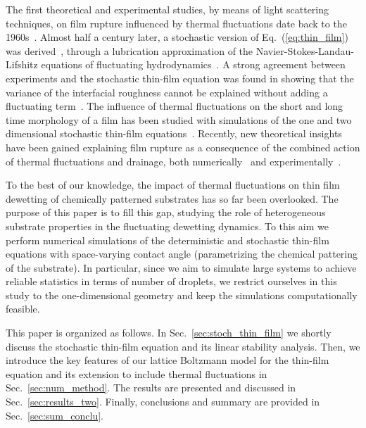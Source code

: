 The first theoretical and experimental studies, by means of light scattering techniques, on film rupture influenced by thermal fluctuations date back to the 1960s~\cite{vrijRuptureThinLiquid1968}.
Almost half a century later, a stochastic version of Eq.~(\ref{eq:thin_film}) was derived~\cite{grunThinFilmFlowInfluenced2006, meckeThermalFluctuationsThin2005, davidovitchSpreadingViscousFluid2005}, through a lubrication approximation of the Navier-Stokes-Landau-Lifshitz equations of fluctuating hydrodynamics~\cite{landauFluidMechanicsLandau2013}.
A strong agreement between experiments and the stochastic thin-film equation was found in showing that the variance of the interfacial roughness cannot be explained without adding a fluctuating term~\cite{fetzerThermalNoiseInfluences2007}.
The influence of thermal fluctuations on the short and long time morphology of a film has been studied with simulations of the one and two dimensional stochastic thin-film equations~\cite{nesicFullyNonlinearDynamics2015, pahlavanThinFilmsPartial2018}. 
Recently, new theoretical insights have been gained explaining film rupture as a consequence of the combined action of thermal fluctuations and drainage, both numerically~\cite{shahThermalFluctuationsCapillary2019} and experimentally~\cite{chatzigiannakisBreakupThinLiquid2020}.

To the best of our knowledge, the impact of thermal fluctuations on thin film dewetting of chemically patterned substrates has so far been overlooked.
The purpose of this paper is to fill this gap, studying the role of heterogeneous substrate properties in the fluctuating dewetting dynamics.
To this aim we perform numerical simulations of the deterministic and stochastic thin-film equations with space-varying contact angle (parametrizing the chemical pattering of the substrate). 
In particular, since we aim to simulate large systems to achieve reliable statistics in terms of number of droplets, we restrict ourselves in this study to the one-dimensional geometry and keep the simulations computationally feasible.

This paper is organized as follows. 
In Sec.~\ref{sec:stoch_thin_film} we shortly discuss the stochastic thin-film equation and its linear stability analysis. 
Then, we introduce the key features of our lattice Boltzmann model for the thin-film equation and its extension to include thermal fluctuations in Sec.~\ref{sec:num_method}. 
The results are presented and discussed in Sec.~\ref{sec:results_two}. 
Finally, conclusions and summary are provided in Sec.~\ref{sec:sum_conclu}. 

